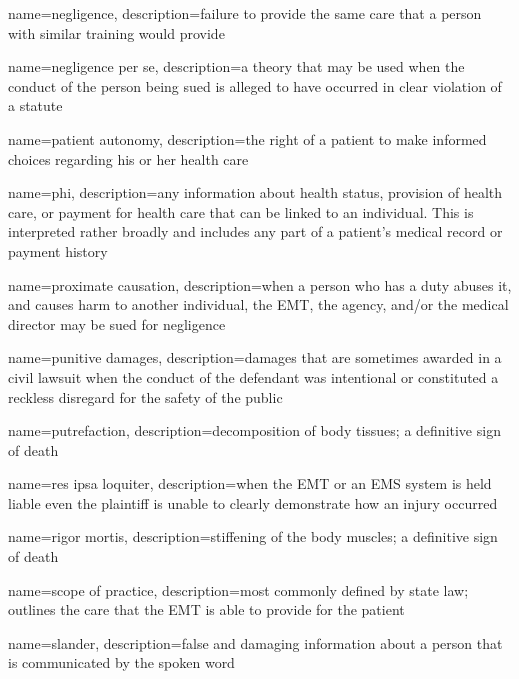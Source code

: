 \documentclass[../../EMT-169.tex]{subfiles}
\begin{document}
	{
		name=negligence,
		description={failure to provide the same care that a person with similar training would provide}
	}

	{
		name=negligence per se,
		description={a theory that may be used when the conduct of the person being sued is alleged to have occurred in clear violation of a statute}
	}

	{
		name=patient autonomy,
		description={the right of a patient to make informed choices regarding his or her health care}
	}

	{
		name=\acrfull{phi},
		description={any information about health status, provision of health care, or payment for health care that can be linked to an individual.  This is interpreted rather broadly and includes any part of a patient's medical record or payment history}
	}

	{
		name=proximate causation,
		description={when a person who has a duty abuses it, and causes harm to another individual, the EMT, the agency, and/or the medical director may be sued for negligence}
	}

	{
		name=punitive damages,
		description={damages that are sometimes awarded in a civil lawsuit when the conduct of the defendant was intentional or constituted a reckless disregard for the safety of the public}
	}

	{
		name=putrefaction,
		description={decomposition of body tissues; a definitive sign of death}
	}

	{
		name=res ipsa loquiter,
		description={when the EMT or an EMS system is held liable even the plaintiff is unable to clearly demonstrate how an injury occurred}
	}
	
	{
		name=rigor mortis,
		description={stiffening of the body muscles; a definitive sign of death}
	}
	
	{
		name=scope of practice,
		description={most commonly defined by state law; outlines the care that the EMT is able to provide for the patient}
	}

	{
		name=slander,
		description={false and damaging information about a person that is communicated by the spoken word}
	}
	
\end{document}

